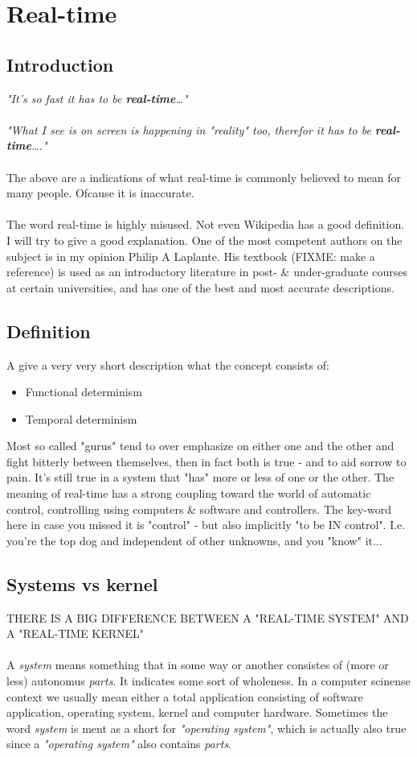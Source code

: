 \part{Real-time}
\chapter{Introduction}
\textit{"It's so fast it has to be \textbf{real-time}\ldots"}
\\\\
\textit{"What I see is on screen is happening in "reality" too, therefor it has to be \textbf{real-time}\ldots."}
\\\\
The above are a indications of what real-time is commonly believed to mean for many people. Ofcause it is inaccurate.
\\\\
The word real-time is highly misused. Not even Wikipedia has a good definition. I will try to give a good explanation. One of the most competent authors on the subject is in my opinion Philip A Laplante. His textbook  (FIXME: make a reference) is used as an introductory literature in post- \& under-graduate courses at certain universities, and has one of the best and most accurate descriptions.


\chapter{Definition}
A give a very very short description what the concept consists of:
\begin{itemize}
\item Functional determinism
\item Temporal determinism
\end{itemize}
Most so called "gurus" tend to over emphasize on either one and the other and fight bitterly between themselves, then in fact both is true - and to aid sorrow to pain. It's still true in a system that "has" more or less of one or the other. The meaning of real-time has a strong coupling toward the world of automatic control, controlling using computers \& software and controllers. The key-word here in case you missed it is "control" - but also implicitly "to be IN control". I.e. you're the top dog and independent of other unknowns, and you "know" it...


\chapter{Systems vs kernel}
THERE IS A BIG DIFFERENCE BETWEEN A "REAL-TIME SYSTEM" AND A "REAL-TIME KERNEL"
\\\\
A \textit{system} means something that in some way or another consistes of (more or less) autonomus \textit{parts}. It indicates some sort of wholeness. In a computer scinense context we usually mean either a total application consisting of software application, operating system, kernel and computer hardware. Sometimes the word \textit{system} is ment as a short for \textit{"operating system"}, which is actually also true since a \textit{"operating system"} also contains \textit{parts}. 

